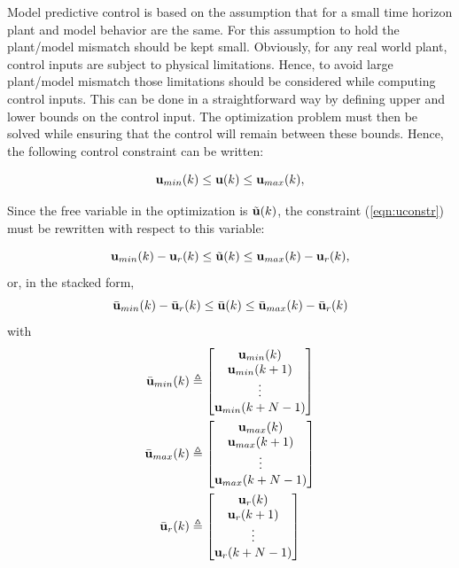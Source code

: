 \documentclass[conference]{IEEEtran} %
\begin{document}
Model predictive control is based on the assumption that for a small time
horizon plant and model behavior are the same. For this assumption to hold
the plant/model mismatch should be kept small. Obviously, for any real
world plant, control inputs are subject to physical limitations. Hence, to
avoid large plant/model mismatch those limitations should be considered
while computing control inputs. This can be done in a straightforward way by
defining upper and lower bounds on the control input. The optimization
problem must then be solved while ensuring that the control will remain
between these bounds. Hence, the following control
constraint can be written:

\begin{equation}\label{eqn:uconstr}
	{\bf u}_{min}(k) \leq {\bf u}(k) \leq {\bf u}_{max}(k),
\end{equation}

Since the free variable in the optimization is $\tilde{\bf u}(k)$,
the constraint (\ref{eqn:uconstr}) must be rewritten with respect to this
variable:

\begin{equation*}
	{\bf u}_{min}(k) - {\bf u}_r(k) \leq \tilde{\bf u}(k) \leq {\bf u}_{max}(k) - {\bf u}_r(k),
\end{equation*}
or, in the stacked form,
\begin{equation*}
	\bar{\bf u}_{min}(k) - \bar{\bf u}_r(k) \leq \bar{\bf u}(k) \leq \bar{\bf u}_{max}(k) - \bar{\bf u}_r(k)
\end{equation*}
\noindent with
\begin{align*}
	\bar{\bf u}_{min}(k) &\triangleq \begin{bmatrix}
		{\bf u}_{min}(k) \\ {\bf u}_{min}(k+1) \\ \vdots \\ {\bf u}_{min}(k+N-1)
	\end{bmatrix} \\
	\bar{\bf u}_{max}(k) &\triangleq \begin{bmatrix}
		{\bf u}_{max}(k) \\ {\bf u}_{max}(k+1) \\ \vdots \\ {\bf u}_{max}(k+N-1)
	\end{bmatrix} \\
	\bar{\bf u}_r(k) &\triangleq \begin{bmatrix}
		{\bf u}_r(k) \\ {\bf u}_r(k+1) \\ \vdots \\ {\bf u}_r(k+N-1)
	\end{bmatrix}
\end{align*}
\end{document}
